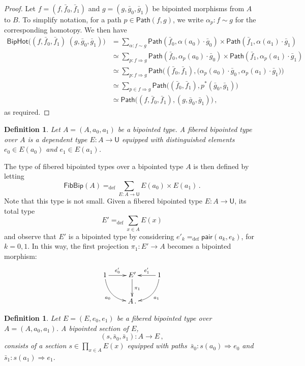 \documentclass[10pt,a4paper,oneside,reqno]{amsart}
\numberwithin{equation}{section}
\theoremstyle{mythm}
\theoremstyle{mydef}
\newtheorem{definition}[theorem]{Definition}
\theoremstyle{myrmk}
\newcommand{\deq}{=}
\newcommand{\defeq}{=_{\mathrm{def}}}
\newcommand{\co}{\colon}
\newcommand{\ct}{\cdot}
\newcommand{\pair}{\mathsf{pair}}
\newcommand{\Id}{\mathsf{Path}}
\newcommand{\UU}{\mathsf{U}}
\newcommand{\FibBip}{\mathsf{FibBip}}
\newcommand{\BipHot}{\mathsf{BipHot}}
\begin{document}
\begin{proof} Let  $f = (f, \bar{f}_0, \bar{f}_1)$ and $g = (g, \bar{g}_0, \bar{g}_1)$ be bipointed
morphisms from $A$ to $B$. To simplify notation, for a path $p \in \Id( f, g)$, we write $\alpha_p \co f \sim g$
for the corresponding homotopy. We then have
\begin{align*}
\BipHot \big( (f,\bar{f}_0,\bar{f}_1) \; (g,\bar{g}_0,\bar{g}_1) \big) & \deq  
\sum_{\alpha : f \sim g} \Id(\bar{f}_0, \alpha(a_0) \ct \bar{g}_0) \times \Id(\bar{f}_1, \alpha(a_1) \ct \bar{g}_1) \\ 
& \simeq \sum_{p  \co  f \Rightarrow g} \Id(\bar{f}_0, \alpha_p(a_0) \ct \bar{g}_0) \times \Id( \bar{f}_1, \alpha_p(a_1) \ct \bar{g}_1) \\
& \simeq
\sum_{p \co f \Rightarrow g} \Id\big( (\bar{f}_0,\bar{f}_1),  \big(\alpha_p(a_0) \ct \bar{g}_0 \, ,  \alpha_p(a_1) \ct \bar{g}_1) \big) \\
& \simeq
\sum_{p \in  f \Rightarrow g} \Id \big(  (\bar{f}_0,\bar{f}_1),  p^{\ast} (\bar{g}_0,\bar{g}_1) \big) \\
& \simeq  \Id \big( (f,\bar{f}_0,\bar{f}_1) , (g,\bar{g}_0,\bar{g}_1)  \big) \, ,
\end{align*} 
as required.
\end{proof}





\begin{definition} \label{def:fibbipointed}
Let $A = (A, a_0, a_1)$ be a bipointed type. A \emph{fibered bipointed type} over $A$ is a dependent type
$E \co A \to \UU$ equipped with distinguished elements $e_0 \in E(a_0)$ and $e_1 \in E(a_1)$.
\end{definition}

The type of  fibered bipointed types over a bipointed type $A$ is then defined by letting
\[
\FibBip(A) \defeq \sum_{E \co A \to \UU} E(a_0) \times E(a_1)  \, .
 \]
 Note that this type is not small. 
Given a fibered bipointed type $E \co A \to \UU$, its total type
\[
E'  \defeq \sum_{x \in A} E(x)
\] 
and observe that $E'$ is a bipointed type by considering $e'_k \defeq \pair(a_k, e_k)$, 
for $k =  0, 1$. In this way, the first projection $\pi_1 \co E' \to A$ becomes a bipointed morphism:
\[
\xymatrix{
1 \ar@/_1pc/[dr]_{a_0} \ar[r]^-{e'_0} & E' \ar[d]^{\pi_1} & 1 \ar[l]_-{e'_1} \ar@/^1pc/[dl]^{a_1} \\ 
 & A \, .& }
 \]



\begin{definition} \label{def:fibsection} Let $E = (E, e_0, e_1)$ be a fibered bipointed type over
$A = (A, a_0, a_1)$.  A \emph{bipointed section} of $E$, 
\[
(s, \bar{s}_0, \bar{s}_1) \co A \to E \, ,
\]
consists of a section $s \in \prod_{x \in A} E(x)$ equipped with paths~$\bar{s}_0 \co s(a_0) \Rightarrow e_0$ 
and $\bar{s}_1 \co  s(a_1) \Rightarrow e_1$. 
\end{definition} 
\end{document}
